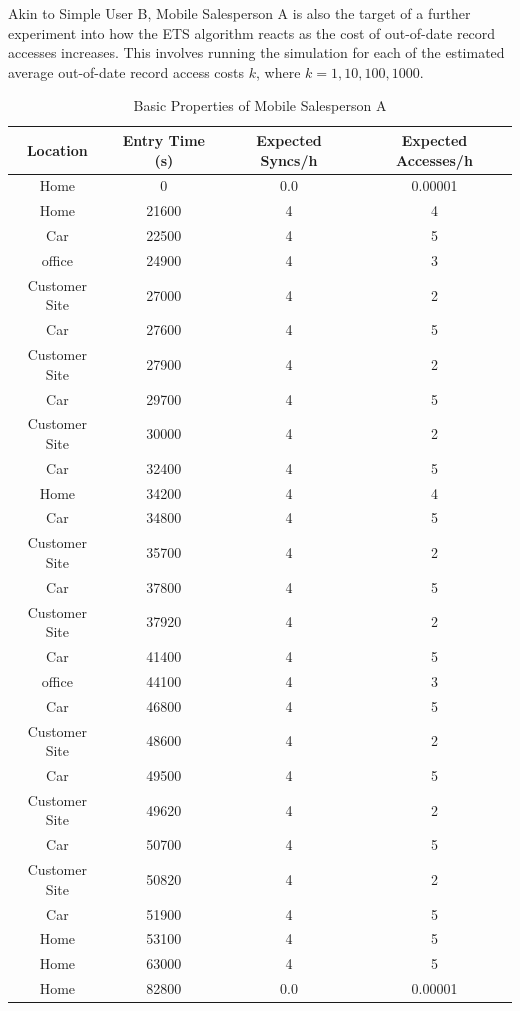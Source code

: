 Akin to Simple User B, Mobile Salesperson A is also the target of a further experiment into how the ETS algorithm reacts as the cost of out-of-date record accesses increases. This involves running the simulation for each of the estimated average out-of-date record access costs $k$, where $k = {1, 10, 100, 1000}$.

\begin{table}[htdp]
\begin{center}
\begin{tabular}{|c|c|c|c|}
\hline
\textbf{Location} & \textbf{Entry Time (s)} & \textbf{Expected Syncs/h} & \textbf{Expected Accesses/h} \\
\hline
Home & 0 & 0.0 & 0.00001 \\
\hline
Home & 21600 & 4 & 4 \\		
\hline
Car & 22500 & 4 & 5 \\
\hline
office & 24900 & 4 & 3 \\
\hline
Customer Site & 27000 & 4 & 2 \\
\hline
Car & 27600 & 4 & 5 \\
\hline
Customer Site & 27900 & 4 & 2 \\
\hline
Car & 29700 & 4 & 5 \\
\hline
Customer Site & 30000 & 4 & 2 \\
\hline
Car & 32400 & 4 & 5 \\
\hline
Home & 34200 & 4 & 4 \\		
\hline
Car & 34800 & 4 & 5 \\
\hline
Customer Site & 35700 & 4 & 2 \\
\hline
Car & 37800 & 4 & 5 \\
\hline
Customer Site & 37920 & 4 & 2 \\
\hline
Car & 41400 & 4 & 5 \\
\hline
office & 44100 & 4 & 3 \\
\hline
Car & 46800 & 4 & 5 \\
\hline
Customer Site & 48600 & 4 & 2 \\
\hline
Car & 49500 & 4 & 5 \\
\hline
Customer Site & 49620 & 4 & 2 \\
\hline
Car & 50700 & 4 & 5 \\
\hline
Customer Site & 50820 & 4 & 2 \\
\hline
Car & 51900 & 4 & 5 \\
\hline
Home & 53100 & 4 & 5 \\
\hline
Home & 63000 & 4 & 5 \\
\hline
Home & 82800 & 0.0 & 0.00001 \\
\hline
\end{tabular}
\end{center}
\caption{Basic Properties of Mobile Salesperson A}
\label{sales_a_properties}
\end{table}

